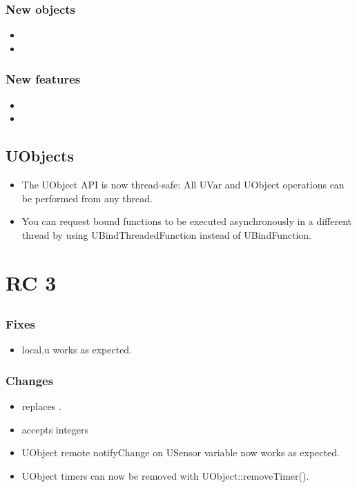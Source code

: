 \subsubsection{New objects}
\begin{itemize}
\item {}
\item {}
\end{itemize}

\subsubsection{New features}
\begin{itemize}
\item {}
\item {}
\end{itemize}

\subsection{UObjects}

\begin{itemize}
\item The UObject API is now thread-safe: All UVar and UObject
  operations can be performed from any thread.
\item You can request bound functions to be executed asynchronously in
  a different thread by using UBindThreadedFunction instead of
  UBindFunction.
\end{itemize}


\section{ RC 3}

\subsection{\us}

\subsubsection{Fixes}
\begin{itemize}
\item local.u works as expected.
\end{itemize}

\subsubsection{Changes}
\begin{itemize}
\item {} replaces .
\item {} accepts integers
\item UObject remote notifyChange on USensor variable now works as expected.
\item UObject timers can now be removed with UObject::removeTimer().
\end{itemize}

